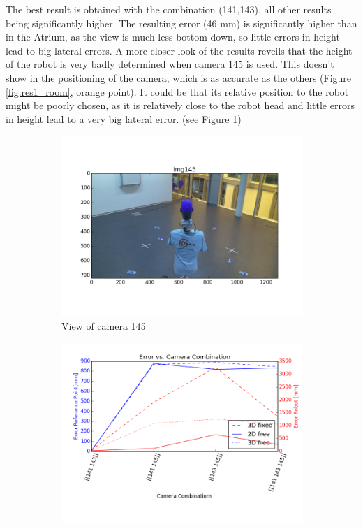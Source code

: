 The best result is obtained with the combination (141,143), all other results being significantly higher. 
The resulting error (46 mm) is significantly higher than in the Atrium, as the view is much less bottom-down, so little errors in height lead to big lateral errors.
A more closer look of the results reveils that the height of the robot is very badly determined when camera 145 is used. This doesn't show in the positioning of the camera, which is as accurate as the others (Figure \ref{fig:res1_room}, orange point). 
It could be that its relative position to the robot might be poorly chosen, as it is relatively close to the robot head and little errors in height lead to a very big lateral error. (see Figure \ref{fig:res1_img145})

\begin{figure}[H]
    \centering
    \begin{subfigure}{0.49\linewidth}
        \centering
        \includegraphics[width=\linewidth]{files/res1_img145.png}
        \caption{View of camera 145}
        \label{fig:res1_img145}
    \end{subfigure}
    \begin{subfigure}{0.49\linewidth}
        \centering
        \includegraphics[width=\linewidth]{files/res1_combi_4.png}

\end{subfigure}
\end{figure}
